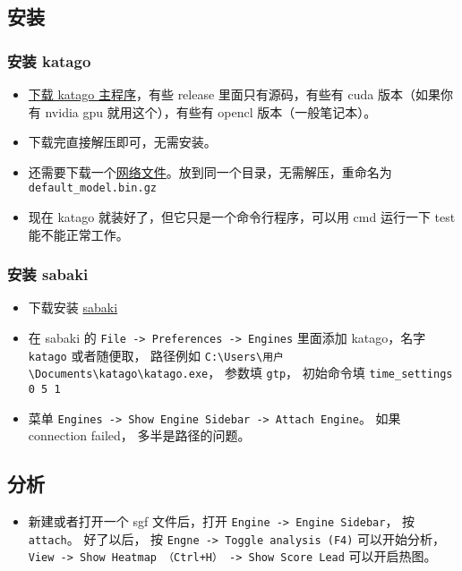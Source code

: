 
\begin{issues}
\issueDraft
\end{issues}

\subsection{安装}
\subsubsection{安装 katago}
\begin{itemize}
\item \href{https://github.com/lightvector/KataGo/releases}{下载 katago 主程序}，有些 release 里面只有源码，有些有 cuda 版本（如果你有 nvidia gpu 就用这个），有些有 opencl 版本（一般笔记本）。
\item 下载完直接解压即可，无需安装。
\item 还需要下载一个\href{https://katagotraining.org/networks/}{网络文件}。放到同一个目录，无需解压，重命名为 \verb`default_model.bin.gz`
\item 现在 katago 就装好了，但它只是一个命令行程序，可以用 cmd 运行一下 test 能不能正常工作。
\end{itemize}

\subsubsection{安装 sabaki}
\begin{itemize}
\item 下载安装 \href{https://sabaki.yichuanshen.de/}{sabaki}
\item 在 sabaki 的 \verb`File -> Preferences -> Engines` 里面添加 katago，名字 \verb`katago` 或者随便取， 路径例如 \verb`C:\Users\用户\Documents\katago\katago.exe`， 参数填 \verb`gtp`， 初始命令填 \verb`time_settings 0 5 1`
\item 菜单 \verb`Engines -> Show Engine Sidebar -> Attach Engine`。 如果 connection failed， 多半是路径的问题。
\end{itemize}

\subsection{分析}
\begin{itemize}
\item 新建或者打开一个 sgf 文件后，打开 \verb`Engine -> Engine Sidebar`， 按 \verb`attach`。 好了以后， 按 \verb`Engne -> Toggle analysis (F4)` 可以开始分析， \verb`View -> Show Heatmap （Ctrl+H） -> Show Score Lead` 可以开启热图。
\end{itemize}
